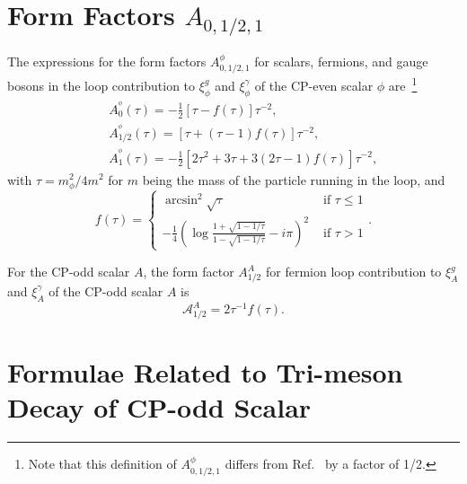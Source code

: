 \documentclass[letterpaper,11pt]{article}
\begin{document}
{\section{Form Factors $A_{0,1/2,1}$}
\label{app:phigg_phigaga}
The expressions for the form factors $A_{0,1/2,1}^\phi$ for scalars, fermions, and gauge bosons in the loop contribution to $\xi_\phi^g$ and $\xi_\phi^\gamma$ of the CP-even scalar $\phi$ are~\footnote{Note that this definition of $A_{0,1/2,1}^\phi$ differs from Ref.~\cite{Djouadi:2005gi} by a factor of 1/2.}
\begin{eqnarray}
&&A_{0}^{^\phi}(\tau) =-\frac{1}{2}[\tau-f(\tau)]\tau^{-2}, \\
&&A_{1 / 2}^{^\phi}(\tau) =[\tau+(\tau-1) f(\tau)] \tau^{-2}, \\
&&A_{1}^{^\phi}(\tau) =-\frac{1}{2}\left[2 \tau^{2}+3 \tau+3(2 \tau-1) f(\tau)\right] \tau^{-2}, 
\label{eq:Aeven}
\end{eqnarray}
with $\tau=m_{\phi}^{2} / 4 m^{2}$ for $m$ being the mass of the particle running in the loop, and 
\begin{equation}
f(\tau)=\left\{\begin{array}{ll}
\arcsin ^{2} \sqrt{\tau} & \text { if } \tau \leqslant 1 \\
-\frac{1}{4}\left(\log \frac{1+\sqrt{1-1 / \tau}}{1-\sqrt{1-1 / \tau}}-i \pi\right)^{2} & \text { if } \tau>1
\end{array}\right.  .
\end{equation}

For the CP-odd scalar $A$, the form factor $A_{1/2}^A$ for fermion loop contribution to $\xi_A^g$ and $\xi_A^\gamma$ of the CP-odd scalar $A$ is 
\begin{equation}
\mathcal{A}_{1/2}^A=2\tau^{-1}f(\tau).
\label{eq:Aodd}
\end{equation}
 

\section{Formulae Related to Tri-meson Decay of CP-odd Scalar}
\label{app:cpoddAdecay}

}
\end{document}
